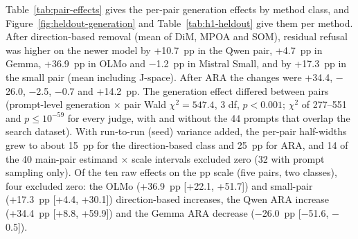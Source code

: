 Table~\ref{tab:pair-effects} gives the per-pair generation effects by method
class, and Figure~\ref{fig:heldout-generation} and Table~\ref{tab:h1-heldout}
give them per method. After direction-based removal (mean of DiM, MPOA and
SOM), residual refusal was higher on the newer model by +10.7~pp in the Qwen
pair, +4.7~pp in Gemma, +36.9~pp in OLMo and $-$1.2~pp in Mistral Small, and
by +17.3~pp in the small pair (mean including J-space). After ARA the changes
were +34.4, $-$26.0, $-$2.5, $-$0.7 and +14.2~pp. The generation effect
differed between pairs (prompt-level generation $\times$ pair Wald $\chi^2=547.4$, 3
df, $p<0.001$; $\chi^2$ of 277--551 and $p\le10^{-59}$ for every judge, with
and without the 44 prompts that overlap the search dataset). With run-to-run (seed) variance added, the per-pair half-widths grew
to about 15~pp for the direction-based class and 25~pp for ARA, and 14 of the
40 main-pair estimand $\times$ scale intervals excluded zero (32 with prompt
sampling only). Of the ten raw effects on the pp scale (five pairs, two
classes), four excluded zero: the OLMo (+36.9~pp
[+22.1, +51.7]) and small-pair (+17.3~pp [+4.4, +30.1]) direction-based
increases, the Qwen ARA increase (+34.4~pp [+8.8, +59.9]) and the Gemma ARA
decrease ($-$26.0~pp [$-$51.6, $-$0.5]).

